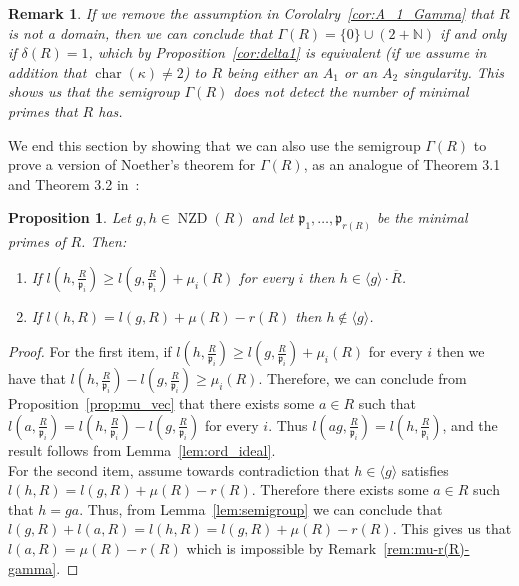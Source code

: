 \documentclass{article}
\newtheorem{proposition}[theorem]{Proposition}
\newtheorem{remark}[theorem]{Remark}
\DeclareMathOperator{\chara}{char}
\DeclareMathOperator{\NZD}{NZD}
\numberwithin{theorem}{section}
\begin{document}
\begin{remark}\label{rem:A_12groups}
    \textup{If we remove the assumption in Corolalry~\ref{cor:A_1_Gamma} that $R$ is not a domain, then we can conclude that $\Gamma(R)= \{0\} \cup (2 + \mathbb{N})$ if and only if $\delta(R)=1$, which by Proposition~\ref{cor:delta1} is equivalent (if we assume in addition that $\chara(\kappa) \neq 2$) to $R$ being either an $A_1$ or an $A_2$ singularity. This shows us that the semigroup $\Gamma(R)$ does not detect the number of minimal primes that $R$ has. }
\end{remark}

We end this section by showing that we can also use the semigroup $\Gamma(R)$ to prove a version of Noether's theorem for $\Gamma(R)$, as an analogue of Theorem 3.1 and Theorem 3.2 in~\cite{ploski1995milnor}:

\begin{proposition}
    Let $g,h \in \NZD(R)$ and let $\mathfrak{p}_1, \dots, \mathfrak{p}_{r(R)}$ be the minimal primes of $R$. Then:
    \begin{enumerate}
        \item If $l(h, \frac{R}{\mathfrak{p}_i}) \geq l(g, \frac{R}{\mathfrak{p}_i}) + \mu_i(R)$ for every $i$ then $h \in \langle g \rangle \cdot \overline{R}$.
        \item If $l(h,R)=l(g,R) + \mu(R) - r(R)$ then $h \notin \langle g \rangle$. 
    \end{enumerate}
\end{proposition}

\begin{proof}
    For the first item, if $l(h, \frac{R}{\mathfrak{p}_i}) \geq l(g, \frac{R}{\mathfrak{p}_i}) + \mu_i(R)$ for every $i$ then we have that $l(h, \frac{R}{\mathfrak{p}_i}) - l(g, \frac{R}{\mathfrak{p}_i}) \geq \mu_i(R)$. Therefore, we can conclude from Proposition~\ref{prop:mu_vec} that there exists some $a \in R$ such that $l(a, \frac{R}{\mathfrak{p}_i})=l(h, \frac{R}{\mathfrak{p}_i}) - l(g, \frac{R}{\mathfrak{p}_i})$ for every $i$. Thus  $l(ag, \frac{R}{\mathfrak{p}_i})=l(h, \frac{R}{\mathfrak{p}_i})$, and  the result follows from Lemma~\ref{lem:ord_ideal}.  \\

    For the second item, assume towards contradiction that $h \in \langle g \rangle$ satisfies $l(h,R)=l(g,R) + \mu(R) - r(R)$. Therefore there exists some $a \in R$ such that $h=ga$. Thus, from Lemma~\ref{lem:semigroup} we can conclude that $l(g,R)+l(a,R)=l(h,R)=l(g,R) + \mu(R) - r(R)$. This gives us that $l(a,R)=\mu(R) - r(R)$ which is impossible by Remark~\ref{rem:mu-r(R)-gamma}. 
\end{proof}
\end{document}
